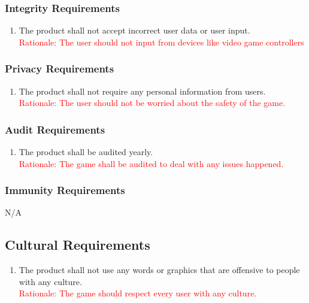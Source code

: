 \documentclass[12pt, titlepage]{article}
\begin{document}
\subsubsection{Integrity Requirements}
\begin{enumerate}
    \item The product shall not accept incorrect user data or user input.\\
    \textcolor{red}{Rationale: The user should not input from devices like video game controllers}
\end{enumerate}

\subsubsection{Privacy Requirements}
\begin{enumerate}
    \item The product shall not require any personal information from users. \\ 
    \textcolor{red}{Rationale: The user should not be worried about the safety of the game.}
\end{enumerate}

\subsubsection{Audit Requirements}
\begin{enumerate}
    \item The product shall be audited yearly.\\
    \textcolor{red}{Rationale: The game shall be audited to deal with any issues happened.}
\end{enumerate}

\subsubsection{Immunity Requirements}
N/A

\subsection{Cultural Requirements}
\begin{enumerate}
    \item The product shall not use any words or graphics that are offensive to people with any culture.\\
    \textcolor{red}{Rationale: The game should respect every user with any culture.}
\end{enumerate}
\end{document}
